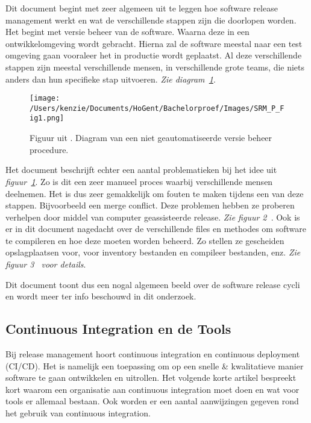 Dit document \autocite{Barshefsky2005} begint met zeer algemeen uit te leggen hoe software release management werkt en wat de verschillende stappen zijn die doorlopen worden. Het begint met versie beheer van de software. Waarna deze in een ontwikkelomgeving wordt gebracht. Hierna zal de software meestal naar een test omgeving gaan vooraleer het in productie wordt geplaatst. Al deze verschillende stappen zijn meestal verschillende mensen, in verschillende grote teams, die niets anders dan hun specifieke stap uitvoeren. \emph{Zie diagram~\ref{fig:FL_fig1}}.
\begin{figure}[!htbp]
    \centering
    \texttt{[image: /Users/kenzie/Documents/HoGent/Bachelorproef/Images/SRM\_P\_Fig1.png]}
    \caption{Figuur uit \autocite{Barshefsky2005}. Diagram van een niet geautomatiseerde versie beheer procedure.}
    \label{fig:FL_fig1}
\end{figure}
Het document \autocite{Barshefsky2005} beschrijft echter een aantal problematieken bij het idee uit \emph{figuur~\ref{fig:FL_fig1}}. Zo is dit een zeer manueel proces waarbij verschillende mensen deelnemen. Het is dus zeer gemakkelijk om fouten te maken tijdens een van deze stappen. Bijvoorbeeld een merge conflict. Deze problemen hebben ze proberen verhelpen door middel van computer geassisteerde release. \emph{Zie figuur 2~\textcite{Barshefsky2005}}. Ook is er in dit document nagedacht over de verschillende files en methodes om software te compileren en hoe deze moeten worden beheerd. Zo stellen ze gescheiden opslagplaatsen voor, voor inventory bestanden en compileer bestanden, enz. \emph{Zie figuur 3~\textcite{Barshefsky2005} voor details}.

Dit document \autocite{Barshefsky2005} toont dus een nogal algemeen beeld over de software release cycli en wordt meer ter info beschouwd in dit onderzoek.

\subsection{Continuous Integration en de Tools}
Bij release management hoort continuous integration en continuous deployment (CI/CD). Het is namelijk een toepassing om op een snelle \& kwalitatieve manier software te gaan ontwikkelen en uitrollen. Het volgende korte artikel \autocite{Meyer2014} bespreekt kort waarom een organisatie aan continuous integration moet doen en wat voor tools er allemaal bestaan. Ook worden er een aantal aanwijzingen gegeven rond het gebruik van continuous integration.

